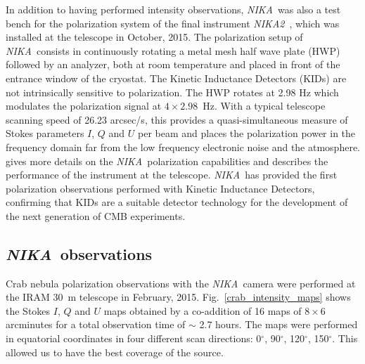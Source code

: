 \documentclass[twocolumn,traditabstract]{aa}
\def\NIKA{\textit{NIKA}}
\def\NIKAd{\textit{NIKA2}}
\begin{document}
In addition to having performed intensity observations, \NIKA\ was also a test bench for
the polarization system of the final instrument \NIKAd\
\citep{calvo2016,2016arXiv160508628C}, which was installed at the telescope in October, 2015. The polarization setup of \NIKA\ consists in continuously rotating a metal mesh half
wave plate (HWP) followed by an analyzer, both at room temperature and
  placed in front of the entrance window of the cryostat. The Kinetic Inductance Detectors (KIDs) are not
  intrinsically sensitive to polarization. The HWP rotates at 2.98 Hz which
  modulates the polarization signal at $4\times 2.98$~Hz. With a typical telescope scanning
  speed of 26.23 arcsec/s, this provides a quasi-simultaneous measure of Stokes parameters $I$,
  $Q$ and $U$ per beam and places the polarization power in the frequency domain far from the low frequency electronic noise and the atmosphere. \cite{ritacco2017} gives more
details on the \NIKA\ polarization capabilities and describes the performance of
the instrument at the telescope.  \NIKA\ has provided the first polarization
observations performed with Kinetic Inductance Detectors, confirming that KIDs are a
suitable detector technology for the development of the next generation of CMB
experiments.

\subsection{\NIKA\ observations}\label{sec:nika_observations}
Crab nebula polarization observations with the \NIKA\ camera were performed at
the IRAM 30~m telescope in February, 2015. Fig.~\ref{crab_intensity_maps} shows
the Stokes $I$, $Q$ and $U$ maps obtained by a co-addition of 16 maps
of $8 \times 6$ arcminutes for a total observation time of $\sim$ 2.7 hours. The
maps were performed in equatorial coordinates in four different scan
directions: 0$^{\circ}$, 90$^{\circ}$, 120$^{\circ}$, 150$^{\circ}$. This
allowed us to have the best coverage of the source.%
\end{document}
